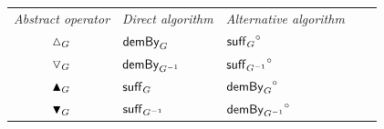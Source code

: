 \vspace{2mm}
\begin{tabular}{|c|l|l|c|c|}
\emph{Abstract operator} & \emph{Direct algorithm} & \emph{Alternative algorithm} \\
$\demandedByR_{G}$ & $\mathrel{\textup{\textsf{demBy}}_{G}}$ & $\mathrel{\textup{\textsf{suff}}_{G}}^{\circ}$ \\
$\triangledown_{G}$ & $\mathrel{\textup{\textsf{demBy}}_{G^{-1}}}$ & $\mathrel{\textup{\textsf{suff}}_{G^{-1}}}^{\circ}$ \\
$\blacktriangle_{G}$ & $\mathrel{\textup{\textsf{suff}}_{G}}$ & $\mathrel{\textup{\textsf{demBy}}_{G}}^{\circ}$ \\
$\blacktriangledown_{G}$ & $\mathrel{\textup{\textsf{suff}}_{G^{-1}}}$ & $\mathrel{\textup{\textsf{demBy}}_{G^{-1}}}^{\circ}$
\end{tabular}
\vspace{2mm}
